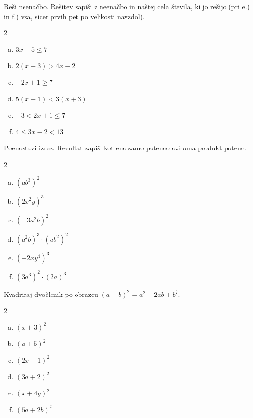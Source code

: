 \documentclass[a4paper,12pt]{letter}
\begin{document}
\begin{naloga}
Re\v{s}i neena\v{c}bo. Re\v{s}itev zapi\v{s}i z neena\v{c}bo in na\v{s}tej cela \v{s}tevila,
ki jo re\v{s}ijo (pri e.) in f.) vsa, sicer prvih pet po velikosti navzdol).

\begin{multicols}{2}
\begin{enumerate}[a.)]
\item $3x-5\le 7$
\item $2(x+3)>4x-2$
\item $-2x+1\ge 7$
\item $5(x-1)<3(x+3)$
\item $-3<2x+1\le 7$
\item $4\le 3x-2<13$
\end{enumerate}
\end{multicols}
\end{naloga}

\newpage

\begin{naloga}
Poenostavi izraz. Rezultat zapi\v{s}i kot eno samo potenco oziroma produkt potenc.

\begin{multicols}{2}
\begin{enumerate}[a.)]
\item $(ab^3)^2$
\item $(2x^2y)^3$
\item $(-3a^2b)^2$
\item $(a^2b)^3\cdot(ab^2)^2$
\item $(-2xy^4)^3$
\item $(3a^3)^2\cdot(2a)^3$
\end{enumerate}
\end{multicols}
\end{naloga}

\begin{naloga}
Kvadriraj dvo\v{c}lenik po obrazcu $(a+b)^2=a^2+2ab+b^2$.

\begin{multicols}{2}
\begin{enumerate}[a.)]
\item $(x+3)^2$
\item $(a+5)^2$
\item $(2x+1)^2$
\item $(3a+2)^2$
\item $(x+4y)^2$
\item $(5a+2b)^2$
\end{enumerate}
\end{multicols}
\end{naloga}
\end{document}

